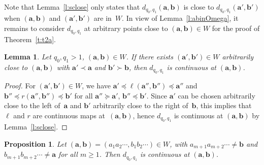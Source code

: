 \documentclass{amsart}
\newtheorem{proposition}[theorem]{Proposition}
\newtheorem{lemma}[theorem]{Lemma}
\theoremstyle{definition}
\numberwithin{equation}{section}
\newcommand{\ba}{\mathbf{a}}
\newcommand{\bb}{\mathbf{b}}
\begin{document}
Note that Lemma~\ref{l:sclose} only states that $d_{q_0,q_1}(\ba,\bb)$ is close to $d_{q_0,q_1}(\ba',\bb')$ when $(\ba,\bb)$ and $(\ba',\bb')$ are in~$W$. 
In view of Lemma~\ref{l:abinOmega}, it remains to consider $d_{q_0,q_1}$ at arbitrary points close to $(\ba,\bb) \in W$ for the proof of Theorem~\ref{t:t2a}.

\begin{lemma} \label{l:abcont}
Let $q_0,q_1 > 1$, $(\ba,\bb) \in W$. 
If there exists $(\ba',\bb') \in W$ arbitrarily close to $(\ba,\bb)$ with $\ba' \prec \ba$ and $\bb' \succ \bb$, then $d_{q_0,q_1}$ is continuous at $(\ba,\bb)$. 
\end{lemma}

\begin{proof}
For $(\ba',\bb') \in W$, we have $\ba' \preceq \ell(\ba'',\bb'') \preceq \ba''$ and $\bb'' \preceq r(\ba'',\bb'') \preceq \bb'$ for all $\ba'' \succeq \ba'$, $\bb'' \preceq \bb'$.
Since $\ba'$ can be chosen arbitrarily close to the left of~$\ba$ and $\bb'$ arbitrarily close to the right of~$\bb$, this implies that $\ell$ and $r$ are continuous maps at~$(\ba,\bb)$, hence $d_{q_0,q_1}$ is continuous at $(\ba,\bb)$ by Lemma~\ref{l:sclose}.
\end{proof}

\begin{proposition} \label{p:nontogether}
Let $(\ba,\bb) = (a_1a_2\cdots, b_1b_2\cdots) \in W$, with $a_{m+1} a_{m+2} \cdots \ne \bb$ and $b_{m+1} b_{m+2}\cdots \ne \ba$ for all $m \ge 1$.
Then $d_{q_0,q_1}$ is continuous at $(\ba,\bb)$. 
\end{proposition}
\end{document}
